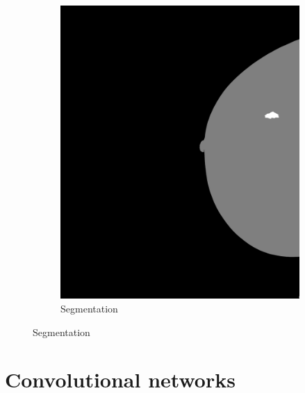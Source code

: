 \documentclass{beamer}
\begin{document}
\begin{frame}
\begin{figure}[h]
\begin{subfigure}{0.35\textwidth}
				\includegraphics[width=\textwidth]{plots/label.png}
				\caption{Segmentation}
			\end{subfigure}
		\end{figure}
	\end{frame}
	
	
	\section[Convolutional networks]{Convolutional networks}

\end{document}
